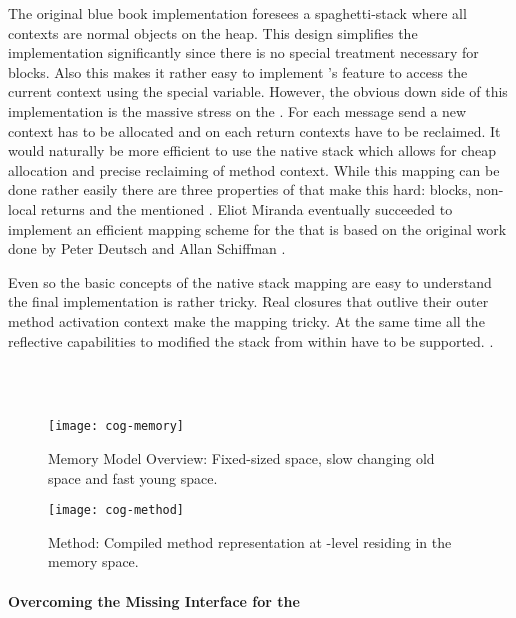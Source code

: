 The original  blue book implementation foresees a spa\-ghet\-ti-stack where all contexts are normal objects on the heap.
This design simplifies the \VM implementation significantly since there is no special treatment necessary for blocks.
Also this makes it rather easy to implement \PH's feature to access the current context using the special  variable.
However, the obvious down side of this implementation is the massive stress on the \GC.
For each message send a new context has to be allocated and on each return contexts have to be reclaimed.
It would naturally be more efficient to use the native stack which allows for cheap allocation and precise reclaiming of method context.
While this mapping can be done rather easily there are three properties of \PH that make this hard: blocks, non-local returns and the mentioned .
Eliot Miranda eventually succeeded to implement an efficient mapping scheme for the \Cog \VM that is based on the original work done by Peter Deutsch and Allan Schiffman \cite{Deut84a}.

Even so the basic concepts of the native stack mapping are easy to understand the final implementation is rather tricky.
Real closures that outlive their outer method activation context make the mapping tricky.
At the same time all the reflective capabilities to modified the stack from within \PH have to be supported.
.


\\
\\

\begin{figure}[h]
	\centering
	\texttt{[image: cog-memory]}
	\caption[\Cog Memory Model Overview]{\Cog Memory Model Overview: Fixed-sized \JIT space, slow changing old space and fast young space.}
\end{figure}

\begin{figure}[h]
	\centering
	\texttt{[image: cog-method]}
	\caption[\Cog Method]{\Cog Method: Compiled method representation at \JIT-level residing in the \JIT memory space.}
\end{figure}

\paragraph{Overcoming the Missing \VM Interface for the \JIT}
\\
\\

